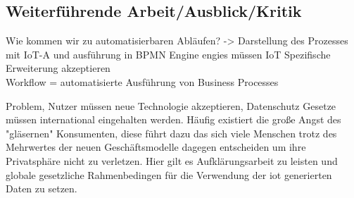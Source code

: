 \documentclass[a4paper, 12pt, twoside, headsepline=true]{scrartcl} %
\begin{document}
\subsection{Weiterführende Arbeit/Ausblick/Kritik}
Wie kommen wir zu automatisierbaren Abläufen? -> Darstellung des Prozesses mit IoT-A und ausführung in BPMN Engine engies müssen IoT Spezifische Erweiterung akzeptieren\\
Workflow = automatisierte Ausführung von Business Processes

Problem, Nutzer müssen neue Technologie akzeptieren, Datenschutz Gesetze müssen international eingehalten werden. Häufig existiert die große Angst des "gläsernen" Konsumenten, diese führt dazu das sich viele Menschen trotz des Mehrwertes der neuen Geschäftsmodelle dagegen entscheiden um ihre Privatsphäre nicht zu verletzen. Hier gilt es Aufklärungsarbeit zu leisten und globale gesetzliche Rahmenbedingen für die Verwendung der \ac{iot} generierten Daten zu setzen.
\newpage

\printbibliography[heading=none]
\newpage
{}
\end{document}
